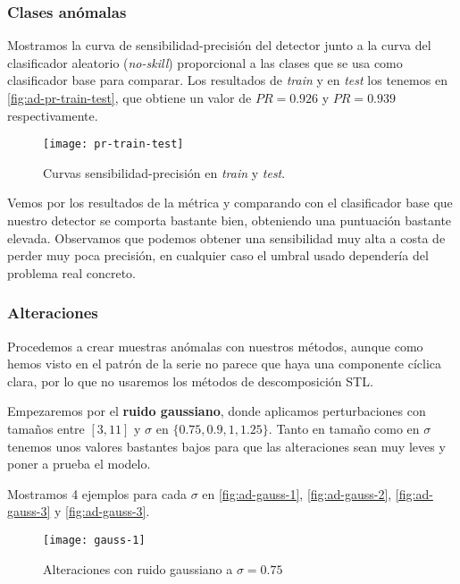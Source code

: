 \subsubsection{Clases anómalas}

Mostramos la curva de sensibilidad-precisión del detector junto a la curva del clasificador aleatorio (\emph{no-skill}) proporcional a las clases que se usa como clasificador base para comparar. Los resultados de \emph{train} y en \emph{test} los tenemos en \autoref{fig:ad-pr-train-test}, que obtiene un valor de $PR = 0.926$ y $PR = 0.939$ respectivamente.

\begin{figure}[htpb]
  \centering
  \texttt{[image: pr-train-test]}
  \caption{Curvas sensibilidad-precisión en \emph{train} y \emph{test}.}
  \label{fig:ad-pr-train-test}
\end{figure}

Vemos por los resultados de la métrica y comparando con el clasificador base que nuestro detector se comporta bastante bien, obteniendo una puntuación bastante elevada. Observamos que podemos obtener una sensibilidad muy alta a costa de perder muy poca precisión, en cualquier caso el umbral usado dependería del problema real concreto.

\subsubsection{Alteraciones}

Procedemos a crear muestras anómalas con nuestros métodos, aunque como hemos visto en el patrón de la serie no parece que haya una componente cíclica clara, por lo que no usaremos los métodos de descomposición STL.

Empezaremos por el \textbf{ruido gaussiano}, donde aplicamos perturbaciones con tamaños entre $[3, 11]$ y $\sigma$ en $\{0.75, 0.9, 1, 1.25\}$. Tanto en tamaño como en $\sigma$ tenemos unos valores bastantes bajos para que las alteraciones sean muy leves y poner a prueba el modelo.

Mostramos 4 ejemplos para cada $\sigma$ en \autoref{fig:ad-gauss-1}, \autoref{fig:ad-gauss-2}, \autoref{fig:ad-gauss-3} y \autoref{fig:ad-gauss-3}.

\begin{figure}[htpb]
  \centering
  \texttt{[image: gauss-1]}
  \caption{Alteraciones con ruido gaussiano a $\sigma = 0.75$}
  \label{fig:ad-gauss-1}
\end{figure}

